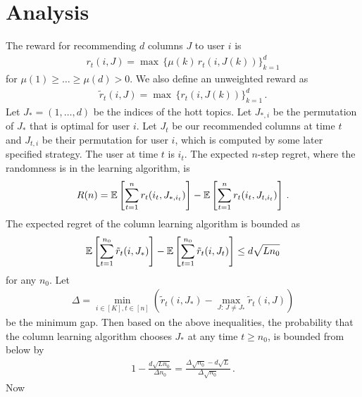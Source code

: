 
\clearpage
\onecolumn
\appendix

\section{Analysis}
\label{sec:analysis}

The reward for recommending $d$ columns $J$ to user $i$ is
\begin{align*}
  r_t(i, J) =
  \max \, \{\mu(k) \, r_t(i, J(k))\}_{k = 1}^d
\end{align*}
for $\mu(1) \geq \dots \geq \mu(d) > 0$. We also define an unweighted reward as
\begin{align*}
  \tilde{r}_t(i, J) =
  \max \, \{r_t(i, J(k))\}_{k = 1}^d\,.
\end{align*}
Let $J_\ast = (1, \dots, d)$ be the indices of the hott topics. Let $J_{\ast, i}$ be the permutation of $J_\ast$ that is optimal for user $i$. Let $J_t$ be our recommended columns at time $t$ and $J_{t, i}$ be their permutation for user $i$, which is computed by some later specified strategy. The user at time $t$ is $i_t$. The expected $n$-step regret, where the randomness is in the learning algorithm, is
\begin{align*}
  R(n) =
  \mathbb{E}\left[\sum_{t = 1}^n r_t(i_t, J_{\ast, i_t})\right] - \mathbb{E}\left[\sum_{t = 1}^n r_t(i_t, J_{t, i_t})\right]\,.
\end{align*}
The expected regret of the column learning algorithm is bounded as
\begin{align*}
  \mathbb{E}\left[\sum_{t = 1}^{n_0} \tilde{r}_t(i, J_\ast)\right] - \mathbb{E}\left[\sum_{t = 1}^{n_0} \tilde{r}_t(i, J_t)\right] \leq
  d \sqrt{L n_0}
\end{align*}
for any $n_0$. Let
\begin{align*}
  \Delta = \min_{i \in [K], t \in [n]} \left(\tilde{r}_t(i, J_\ast) - \max_{J:\, J \neq J_\ast} \tilde{r}_t(i, J)\right)
\end{align*}
be the minimum gap. Then based on the above inequalities, the probability that the column learning algorithm chooses $J_\ast$ at any time $t \geq n_0$, is bounded from below by
\begin{align*}
  1 - \frac{d \sqrt{L n_0}}{\Delta n_0} =
  \frac{\Delta \sqrt{n_0} - d \sqrt{L}}{\Delta \sqrt{n_0}}\,.
  \label{eq:opt lower bound}
\end{align*}
Now 




